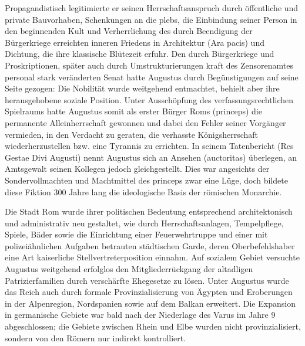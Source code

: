 Propagandistisch legitimierte er seinen Herrschaftsanspruch durch öffentliche und private Bauvorhaben, Schenkungen an die plebs, die Einbindung seiner Person in den beginnenden Kult und Verherrlichung des durch Beendigung der Bürgerkriege erreichten inneren Friedens in Architektur (Ara pacis) und Dichtung, die ihre klassische Blütezeit erfuhr. Den durch Bürgerkriege und Proskriptionen, später auch durch Umstrukturierungen kraft des Zensorenamtes personal stark veränderten Senat hatte Augustus durch Begünstigungen auf seine Seite gezogen: Die Nobilität wurde weitgehend entmachtet, behielt aber ihre herausgehobene soziale Position. Unter Ausschöpfung des verfassungsrechtlichen Spielraums hatte Augustus somit als erster Bürger Roms (princeps) die permanente Alleinherrschaft gewonnen und dabei den Fehler seiner Vorgänger vermieden, in den Verdacht zu geraten, die verhasste Königsherrschaft wiederherzustellen bzw. eine Tyrannis zu errichten. In seinem Tatenbericht (Res Gestae Divi Augusti) nennt Augustus sich an Ansehen (auctoritas) überlegen, an Amtsgewalt seinen Kollegen jedoch gleichgestellt. Dies war angesichts der Sondervollmachten und Machtmittel des princeps zwar eine Lüge, doch bildete diese Fiktion 300 Jahre lang die ideologische Basis der römischen Monarchie.

Die Stadt Rom wurde ihrer politischen Bedeutung entsprechend architektonisch und administrativ neu gestaltet, wie durch Herrschaftsanlagen, Tempelpflege, Spiele, Bäder sowie die Einrichtung einer Feuerwehrtruppe und einer mit polizeiähnlichen Aufgaben betrauten städtischen Garde, deren Oberbefehlshaber eine Art kaiserliche Stellvertreterposition einnahm. Auf sozialem Gebiet versuchte Augustus weitgehend erfolglos den Mitgliederrückgang der altadligen Patrizierfamilien durch verschärfte Ehegesetze zu lösen. Unter Augustus wurde das Reich auch durch formale Provinzialisierung von Ägypten und Eroberungen in der Alpenregion, Nordspanien sowie auf dem Balkan erweitert. Die Expansion in germanische Gebiete war bald nach der Niederlage des Varus im Jahre 9 abgeschlossen; die Gebiete zwischen Rhein und Elbe wurden nicht provinzialisiert, sondern von den Römern nur indirekt kontrolliert.

